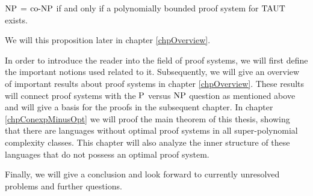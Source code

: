   \begin{proposition} \label{prpNPcoNP}
    \(\NP\) = \(\coNP\) if and only if a polynomially bounded proof system for \(\TAUT\) exists.
  \end{proposition}

  We will this proposition later in chapter \ref{chpOverview}.
  
  In order to introduce the reader into the field of proof systems, we will first define the important notions used related to it. Subsequently, we will give an overview of important results about proof systems in chapter \ref{chpOverview}. These results will connect proof systems with the \(\P\) versus \(\NP\) question as mentioned above and will give a basis for the proofs in the subsequent chapter.
  In chapter \ref{chpConexpMinusOpt} we will proof the main theorem of this thesis, showing that there are languages without optimal proof systems in all super-polynomial complexity classes. This chapter will also analyze the inner structure of these languages that do not possess an optimal proof system.

  Finally, we will give a conclusion and look forward to currently unresolved problems and further questions.

